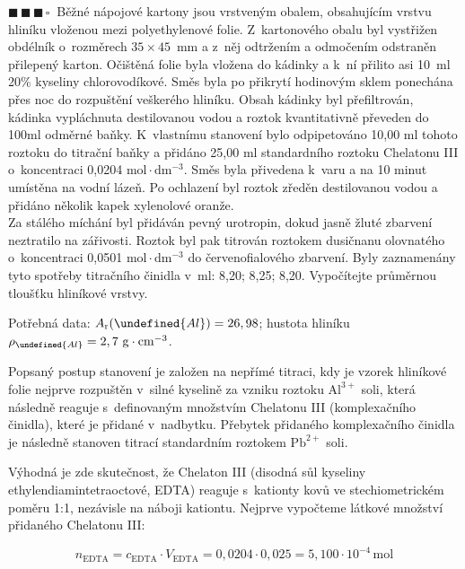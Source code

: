 \documentclass{book}
\let\ch\undefined
\newcommand{\tri}{$\blacksquare \, \blacksquare \, \blacksquare \, \square \; \; $}
\renewenvironment{quotation}{\par}{\par} %
\begin{document}
\hrulefill %
\begin{quotation}
\tri Běžné nápojové kartony jsou vrstveným obalem, obsahujícím vrstvu hliníku
vloženou mezi polyethylenové folie. Z~kartonového obalu byl vystřižen
obdélník o~rozměrech $35\times45$~mm a z~něj odtržením a odmočením odstraněn
přilepený karton. Očištěná folie byla vložena do kádinky a k~ní přilito
asi 10~ml 20\% kyseliny chlorovodíkové. Směs byla po přikrytí hodinovým
sklem ponechána přes noc do rozpuštění veškerého hliníku. Obsah kádinky
byl přefiltrován, kádinka vypláchnuta destilovanou vodou a roztok
kvantitativně převeden do 100ml odměrné baňky. K~vlastnímu stanovení
bylo odpipetováno 10,00 ml tohoto roztoku do titrační baňky a přidáno
25,00 ml standardního roztoku Chelatonu III o~koncentraci 0,0204 $\mathrm{mol\cdot dm^{-3}}$.
Směs byla přivedena k~varu a na 10 minut umístěna na vodní lázeň.
Po ochlazení byl roztok zředěn destilovanou vodou a přidáno několik
kapek xylenolové oranže.\\
Za stálého míchání byl přidáván pevný urotropin,
dokud jasně žluté zbarvení neztratilo na zářivosti. Roztok byl pak
titrován roztokem dusičnanu olovnatého o~koncentraci 0,0501 $\mathrm{mol\cdot dm^{-3}}$
do červenofialového zbarvení. Byly zaznamenány tyto spotřeby titračního
činidla v~ml: 8,20; 8,25; 8,20. Vypočítejte průměrnou tloušťku
hliníkové vrstvy.

Potřebná data: $A_{\mathrm{r}}(\ch{Al})=26,98$; hustota hliníku
$\rho_{\ch{Al}}=2,7\ \mathrm{g\cdot cm^{-3}}$.
\end{quotation} \dotfill \par 
Popsaný postup stanovení je založen na nepřímé titraci, kdy je vzorek
hliníkové folie nejprve rozpuštěn v~silné kyselině za vzniku roztoku
$\mathrm{Al^{3+}}$ soli, která následně reaguje s~definovaným množstvím
Chelatonu III (komplexačního činidla), které je přidané v~nadbytku. Přebytek přidaného komplexačního činidla je následně
stanoven titrací standardním roztokem $\mathrm{Pb^{2+}}$ soli. 

Výhodná je zde skutečnost,
že Chelaton III (disodná sůl kyseliny ethylen\-diamin\-tetraoctové, EDTA) reaguje s~kationty kovů ve stechiometrickém poměru 1:1, nezávisle na náboji kationtu. Nejprve vypočteme látkové množství přidaného Chelatonu III: 

\[
n_{\mathrm{EDTA}}=c_{\mathrm{EDTA}}\cdot V_{\mathrm{EDTA}}=0,0204\cdot0,025=5,100\cdot10^{-4}\,\mathrm{mol}
\]
\end{document}
